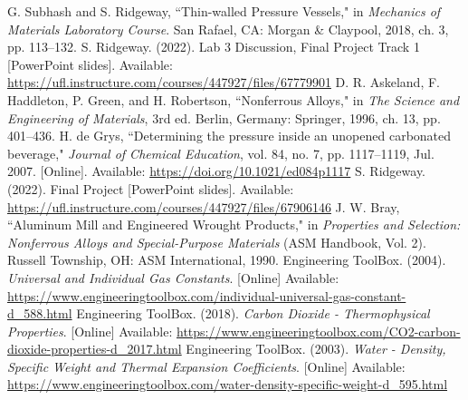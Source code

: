 \documentclass[10pt,journal,letterpaper]{IEEEtran}
\begin{document}
\begin{thebibliography}{00}
 G. Subhash and S. Ridgeway, ``Thin-walled Pressure Vessels," in \textit{Mechanics of Materials Laboratory Course}. San Rafael, CA: Morgan \& Claypool, 2018, ch. 3, pp. 113--132.
 S. Ridgeway. (2022). Lab 3 Discussion, Final Project Track 1 [PowerPoint slides]. Available: \url{https://ufl.instructure.com/courses/447927/files/67779901}
 D. R. Askeland, F. Haddleton, P. Green, and H. Robertson, ``Nonferrous Alloys," in \textit{The Science and Engineering of Materials}, 3rd ed. Berlin, Germany: Springer, 1996, ch. 13, pp. 401--436.
 H. de Grys, ``Determining the pressure inside an unopened carbonated beverage," \textit{Journal of Chemical Education}, vol. 84, no. 7, pp. 1117--1119, Jul. 2007. [Online]. Available: \url{https://doi.org/10.1021/ed084p1117}
 S. Ridgeway. (2022). Final Project [PowerPoint slides]. Available: \url{https://ufl.instructure.com/courses/447927/files/67906146}
 J. W. Bray, ``Aluminum Mill and Engineered Wrought Products," in \textit{Properties and Selection: Nonferrous Alloys and Special-Purpose Materials} (ASM Handbook, Vol. 2). Russell Township, OH: ASM International, 1990.
 Engineering ToolBox. (2004). \textit{Universal and Individual Gas Constants}. [Online] Available: \url{https://www.engineeringtoolbox.com/individual-universal-gas-constant-d_588.html}
 Engineering ToolBox. (2018). \textit{Carbon Dioxide - Thermophysical Properties}. [Online] Available: \url{https://www.engineeringtoolbox.com/CO2-carbon-dioxide-properties-d_2017.html}
 Engineering ToolBox. (2003). \textit{Water - Density, Specific Weight and Thermal Expansion Coefficients}. [Online] Available: \url{https://www.engineeringtoolbox.com/water-density-specific-weight-d_595.html}
\end{thebibliography}
\end{document}
